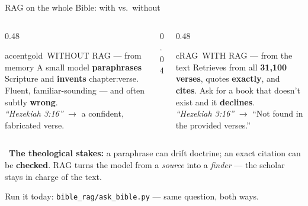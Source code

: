 \begin{frame}{RAG on the whole Bible: with vs.\ without}
  \begin{columns}[t, totalwidth=\textwidth]
    \begin{column}{0.48\textwidth}
      \begin{featbox}{accentgold}{\faGhost\ WITHOUT RAG --- from memory}
        \scriptsize A small model \textbf{paraphrases} Scripture and \textbf{invents}
        chapter:verse. Fluent, familiar-sounding --- and often subtly \textbf{wrong}.
        \\[4pt]{\tiny\color{midgray}\emph{``Hezekiah 3:16''} $\to$ a confident, fabricated verse.}
      \end{featbox}
    \end{column}
    \begin{column}{0.04\textwidth}\end{column}
    \begin{column}{0.48\textwidth}
      \begin{featbox}{cRAG}{\faCheckDouble\ WITH RAG --- from the text}
        \scriptsize Retrieves from all \textbf{31,100 verses}, quotes \textbf{exactly},
        and \textbf{cites}. Ask for a book that doesn't exist and it \textbf{declines}.
        \\[4pt]{\tiny\color{midgray}\emph{``Hezekiah 3:16''} $\to$ ``Not found in the provided verses.''}
      \end{featbox}
    \end{column}
  \end{columns}
  \vspace{8pt}
  \begin{calloutbox}[cRAG]
    \small\faBalanceScale\ \textbf{The theological stakes:} a paraphrase can drift
    doctrine; an exact citation can be \textbf{checked}. RAG turns the model from a
    \emph{source} into a \emph{finder} --- the scholar stays in charge of the text.
  \end{calloutbox}
  \vspace{2pt}
  \begin{center}\footnotesize\color{midgray}%
    Run it today: \texttt{bible\_rag/ask\_bible.py} --- same question, both ways.\end{center}
\end{frame}

